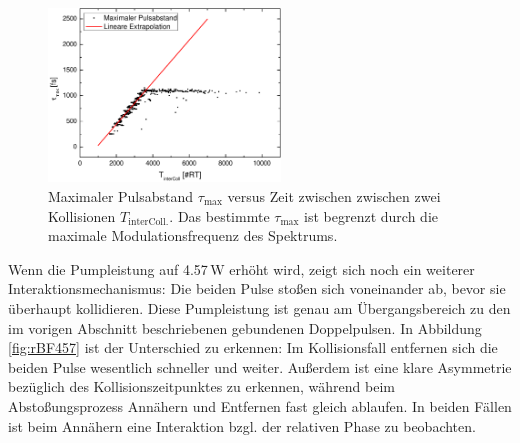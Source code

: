 \documentclass[bachelor,       %
               twoside,        %
               BCOR10mm,       %
               english,ngerman, %
               ]{GAUBM}
\begin{document}
\begin{figure}[!htb]
	\centering
	\includegraphics[width=0.55\textwidth]{figures/bounceDistTime}
	\caption{Maximaler Pulsabstand $\tau_\text{max}$ versus Zeit zwischen zwischen zwei Kollisionen $T_\text{interColl.}$. Das bestimmte $\tau_\text{max}$ ist begrenzt durch die maximale Modulationsfrequenz des Spektrums.}
	\label{fig:bounceDistTime}
\end{figure}

Wenn die Pumpleistung auf 4.57\,W erhöht wird, zeigt sich noch ein weiterer Interaktionsmechanismus: Die beiden Pulse stoßen sich voneinander ab, bevor sie überhaupt kollidieren.
Diese Pumpleistung ist genau am Übergangsbereich zu den im vorigen Abschnitt beschriebenen gebundenen Doppelpulsen.
In Abbildung \ref{fig:rBF457} ist der Unterschied zu erkennen: Im Kollisionsfall entfernen sich die beiden Pulse wesentlich schneller und weiter.
Außerdem ist eine klare Asymmetrie bezüglich des Kollisionszeitpunktes zu erkennen, während beim Abstoßungsprozess Annähern und Entfernen fast gleich ablaufen.
In beiden Fällen ist beim Annähern eine Interaktion bzgl. der relativen Phase zu beobachten.
\end{document}
